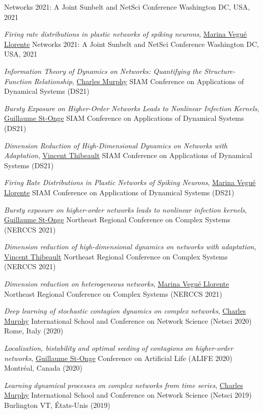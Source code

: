 \documentclass[11pt]{article}
\makeatletter
\newcommand{\reversearabic}[1]{\expandafter\@reversearabic\csname c@#1\endcsname}
\newcommand{\@reversearabic}[1]{%
  \number\numexpr\getrefnumber{this@etaremune@\romannumeral\c@etaremune}-#1+1\relax
}
\newcounter{etaremune}
\newenvironment{etaremune}[1][]{%
  \stepcounter{etaremune}%
  \begin{enumerate}[label=\reversearabic*.,#1]%
}{%
  \edef\@currentlabel{\the\csname c@\@enumctr\endcsname}%
  \label{this@etaremune@\romannumeral\c@etaremune}%
  \end{enumerate}%
}
\makeatother
\begin{document}
\begin{etaremune}[itemsep=0.5em, label={[M\reversearabic*]}, first*=\small\vspace{0.5\baselineskip}]
{  Networks 2021: A Joint Sunbelt and NetSci Conference\split
  Washington DC, USA, 2021}
%
  \item \parbox[t]{\textwidth-30pt}{\textit{Firing rate distributions in plastic networks of spiking neurons},
  \uline{Marina Vegué Llorente}\split
  Networks 2021: A Joint Sunbelt and NetSci Conference\split
  Washington DC, USA, 2021}
%
  \item \parbox[t]{\textwidth-30pt}{\textit{Information Theory of Dynamics on Networks: Quantifying the Structure-Function Relationship},
  \uline{Charles Murphy}\split
  SIAM Conference on Applications of Dynamical Systems (DS21)}
%
  \item \parbox[t]{\textwidth-30pt}{\textit{Bursty Exposure on Higher-Order Networks Leads to Nonlinear Infection Kernels},
  \uline{Guillaume St-Onge}\split
  SIAM Conference on Applications of Dynamical Systems (DS21)}
%
  \item \parbox[t]{\textwidth-30pt}{\textit{Dimension Reduction of High-Dimensional Dynamics on Networks with Adaptation},
  \uline{Vincent Thibeault}\split
  SIAM Conference on Applications of Dynamical Systems (DS21)}
%
  \item \parbox[t]{\textwidth-30pt}{\textit{Firing Rate Distributions in Plastic Networks of Spiking Neurons},
  \uline{Marina Vegué Llorente}\split
  SIAM Conference on Applications of Dynamical Systems (DS21)}
%
  \item \parbox[t]{\textwidth-30pt}{\textit{Bursty exposure on higher-order networks leads to nonlinear infection kernels},
  \uline{Guillaume St-Onge}\split
  Northeast Regional Conference on Complex Systems (NERCCS 2021)}
%
  \item \parbox[t]{\textwidth-30pt}{\textit{Dimension reduction of high-dimensional dynamics on networks with adaptation},
  \uline{Vincent Thibeault}\split
  Northeast Regional Conference on Complex Systems (NERCCS 2021)}
%
  \item \parbox[t]{\textwidth-30pt}{\textit{Dimension reduction on heterogeneous networks},
  \uline{Marina Vegué Llorente}\split
  Northeast Regional Conference on Complex Systems (NERCCS 2021)}
%
  \item \parbox[t]{\textwidth-30pt}{\textit{Deep learning of stochastic contagion dynamics on complex networks},
  \uline{Charles Murphy}\split
  International School and Conference on Network Science (Netsci 2020)\split
  Rome, Italy (2020)}
%
  \item \parbox[t]{\textwidth-30pt}{\textit{Localization, bistability and optimal seeding of contagions on higher-order networks},
  \uline{Guillaume St-Onge}\split
  Conference on Artificial Life (ALIFE 2020)\split
  Montréal, Canada (2020)}
%
  \item \parbox[t]{\textwidth-30pt}{\textit{Learning dynamical processes on complex networks from time series},
  \uline{Charles Murphy}\split
  International School and Conference on Network Science (Netsci 2019)\split
  Burlington VT, États-Unis (2019)}
%
\end{etaremune} \vspace{0.75\baselineskip}
\end{document}
